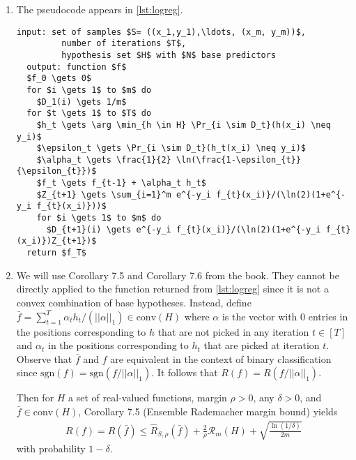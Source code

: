 \begin{enumerate}
\begin{enumerate}
    At iteration $t$, the step is given by
    $\alpha_t = \alpha_{t-1} + \eta e_k$
    where $\eta$ is the step size given in 
    \autoref{eq:stepsize} and $e_k$ is the step direction
    chosen because its error is smallest.
    In terms of $f_t = \sum_{i=j}^N \alpha_{t,j} h_j$,
    the step is given by
    $f_t = f_{t-1} + \eta h_k = f_{t-1} + \alpha_t h_t$
    where $\alpha_t = \eta$ and $h_t=h_k$ are alternate
    notation for the step size and direction.

    \item The pseudocode appears in \autoref{lst:logreg}.

    \begin{minipage}{\linewidth}
    \begin{lstlisting}[caption={Logistic loss boosting.}, label={lst:logreg}]
  input: set of samples $S= ((x_1,y_1),\ldots, (x_m, y_m))$,
         number of iterations $T$,
         hypothesis set $H$ with $N$ base predictors
  output: function $f$
  $f_0 \gets 0$
  for $i \gets 1$ to $m$ do
    $D_1(i) \gets 1/m$
  for $t \gets 1$ to $T$ do
    $h_t \gets \arg \min_{h \in H} \Pr_{i \sim D_t}(h(x_i) \neq y_i)$
    $\epsilon_t \gets \Pr_{i \sim D_t}(h_t(x_i) \neq y_i)$
    $\alpha_t \gets \frac{1}{2} \ln(\frac{1-\epsilon_{t}}{\epsilon_{t}})$
    $f_t \gets f_{t-1} + \alpha_t h_t$
    $Z_{t+1} \gets \sum_{i=1}^m e^{-y_i f_{t}(x_i)}/(\ln(2)(1+e^{-y_i f_{t}(x_i)}))$
    for $i \gets 1$ to $m$ do
      $D_{t+1}(i) \gets e^{-y_i f_{t}(x_i)}/(\ln(2)(1+e^{-y_i f_{t}(x_i)})Z_{t+1})$
  return $f_T$
    \end{lstlisting}
    \end{minipage}

    \item
    We will use Corollary 7.5 and Corollary 7.6 from the book.
    They cannot be directly applied to the function returned
    from \autoref{lst:logreg} since it is not a convex combination
    of base hypotheses.
    Instead, define
    $\bar{f} = \sum_{t=1}^T \alpha_t h_t / (||\alpha||_1) \in \textrm{conv}(H)$
    where $\alpha$ is the vector with 0 entries in the positions corresponding
    to $h$ that are not picked in any iteration $t \in [T]$ and $\alpha_t$
    in the positions corresponding to $h_t$ that are picked at iteration $t$.
    Observe that $\bar{f}$ and $f$ are equivalent in the context
    of binary classification since $\textrm{sgn}(f) = \textrm{sgn}(f/||\alpha||_1)$.
    It follows that $R(f) = R(f/||\alpha||_1)$.

    Then for $H$ a set of real-valued functions, margin $\rho>0$, any
    $\delta>0$, and $\bar{f} \in \textrm{conv}(H)$,
    Corollary 7.5 (Ensemble Rademacher margin bound) yields
    \begin{align}
        R(f) = R(\bar{f}) \leq \hat{R}_{S,\rho}(\bar{f}) + \frac{2}{\rho}
        \mathcal{R}_m(H) + \sqrt{\frac{\ln(1/\delta)}{2m}}
        \nonumber
    \end{align}
    with probability $1-\delta$.


\end{enumerate}
\end{enumerate}
